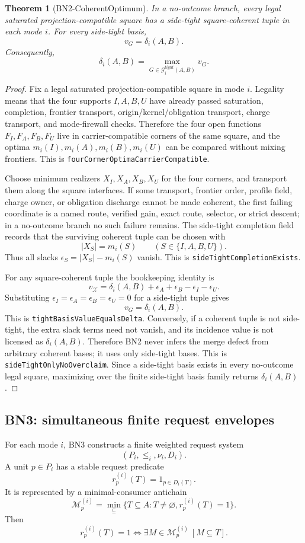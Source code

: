 \documentclass[10.5pt,a4paper]{article}
\newtheorem{theorem}{Theorem}[section]
\begin{document}
\begin{theorem}[BN2-CoherentOptimum]
In a no-outcome branch, every legal saturated projection-compatible square has a side-tight square-coherent tuple in each mode \(i\). For every side-tight basis,
\[
 v_G=\delta_i(A,B).
\]
Consequently,
\[
\delta_i(A,B)=\max_{G\in\mathcal G_i^{tight}(A,B)}v_G.
\]
\end{theorem}

\begin{proof}
Fix a legal saturated projection-compatible square in mode \(i\).  Legality means that the four supports \(I,A,B,U\) have already passed saturation, completion, frontier transport, origin/kernel/obligation transport, charge transport, and mode-firewall checks.  Therefore the four open functions \(F_I,F_A,F_B,F_U\) live in carrier-compatible corners of the same square, and the optima \(m_i(I),m_i(A),m_i(B),m_i(U)\) can be compared without mixing frontiers.  This is \texttt{fourCornerOptimaCarrierCompatible}.

Choose minimum realizers \(X_I,X_A,X_B,X_U\) for the four corners, and transport them along the square interfaces.  If some transport, frontier order, profile field, charge owner, or obligation discharge cannot be made coherent, the first failing coordinate is a named route, verified gain, exact route, selector, or strict descent; in a no-outcome branch no such failure remains.  The side-tight completion field records that the surviving coherent tuple can be chosen with
\[
 |X_S|=m_i(S)\qquad(S\in\{I,A,B,U\}).
\]
Thus all slacks \(\epsilon_S=|X_S|-m_i(S)\) vanish.  This is \texttt{sideTightCompletionExists}.

For any square-coherent tuple the bookkeeping identity is
\[
 v_{\mathcal X}=\delta_i(A,B)+\epsilon_A+\epsilon_B-\epsilon_I-\epsilon_U.
\]
Substituting \(\epsilon_I=\epsilon_A=\epsilon_B=\epsilon_U=0\) for a side-tight tuple gives
\[
 v_G=\delta_i(A,B).
\]
This is \texttt{tightBasisValueEqualsDelta}.  Conversely, if a coherent tuple is not side-tight, the extra slack terms need not vanish, and its incidence value is not licensed as \(\delta_i(A,B)\).  Therefore BN2 never infers the merge defect from arbitrary coherent bases; it uses only side-tight bases.  This is \texttt{sideTightOnlyNoOverclaim}.  Since a side-tight basis exists in every no-outcome legal square, maximizing over the finite side-tight basis family returns \(\delta_i(A,B)\).
\end{proof}

\subsection{BN3: simultaneous finite request envelopes}
For each mode \(i\), BN3 constructs a finite weighted request system
\[
(P_i,\le_i,\nu_i,D_i).
\]
A unit \(p\in P_i\) has a stable request predicate
\[
r_p^{(i)}(T)=1_{p\in D_i(T)}.
\]
It is represented by a minimal-consumer antichain
\[
\mathcal M_p^{(i)}=\min_\subseteq\{T\subseteq A:T\ne\varnothing,
 r_p^{(i)}(T)=1\}.
\]
Then
\[
r_p^{(i)}(T)=1\Longleftrightarrow \exists M\in\mathcal M_p^{(i)}\ [M\subseteq T].
\]
\end{document}

